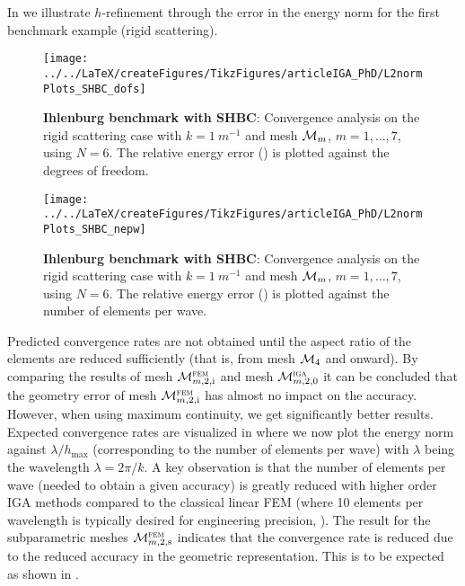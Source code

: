 In  we illustrate $h$-refinement through the error in the energy norm for the first benchmark example (rigid scattering).
\begin{figure}
	\centering
	\texttt{[image: ../../LaTeX/createFigures/TikzFigures/articleIGA\_PhD/L2normPlots\_SHBC\_dofs]}
	\caption{\textbf{Ihlenburg benchmark with SHBC}: Convergence analysis on the rigid scattering case with $k=\SI{1}{m^{-1}}$ and mesh ${\cal M}_m$, $m=1,\dots,7$, using $N=6$. The relative energy error () is plotted against the degrees of freedom.}
	\label{Fig2:EnergyErrorPlotsDofs}
	\par\bigskip
	\texttt{[image: ../../LaTeX/createFigures/TikzFigures/articleIGA\_PhD/L2normPlots\_SHBC\_nepw]}
	\caption{\textbf{Ihlenburg benchmark with SHBC}: Convergence analysis on the rigid scattering case with $k=\SI{1}{m^{-1}}$ and mesh ${\cal M}_m$, $m=1,\dots,7$, using $N=6$. The relative energy error () is plotted against the number of elements per wave.}
	\label{Fig2:EnergyErrorPlotsh}
\end{figure}
Predicted convergence rates are not obtained until the aspect ratio of the elements are reduced sufficiently (that is, from mesh ${\cal M}_4$ and onward). By comparing the results of mesh ${\cal M}_{m,2,\mathrm{i}}^{\textsc{fem}}$ and mesh ${\cal M}_{m,2,0}^{\textsc{iga}}$ it can be concluded that the geometry error of mesh ${\cal M}_{m,2,\mathrm{i}}^{\textsc{fem}}$ has almost no impact on the accuracy. However, when using maximum continuity, we get significantly better results. Expected convergence rates are visualized in  where we now plot the energy norm against $\lambda/h_{\mathrm{max}}$ (corresponding to the number of elements per wave) with $\lambda$ being the wavelength $\lambda=2\pi/k$. A key observation is that the number of elements per wave (needed to obtain a given accuracy) is greatly reduced with higher order IGA methods compared to the classical linear FEM (where 10 elements per wavelength is typically desired for engineering precision, \cite[p. 182]{Ihlenburg1998fea}). The result for the subparametric meshes ${\cal M}_{m,2,\mathrm{s}}^{\textsc{fem}}$ indicates that the convergence rate is reduced due to the reduced accuracy in the geometric representation. This is to be expected as shown in \cite[p. 202]{Strang1973aao}.


